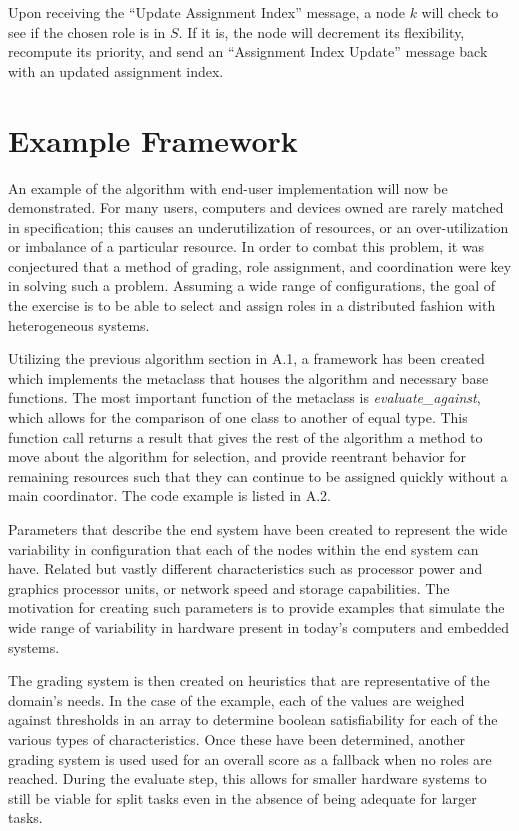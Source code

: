 \documentclass[11pt]{article}
\begin{document}
\begin{multicols}{2}
Upon receiving the ``Update Assignment Index'' message, a node $k$ will check to see if the chosen role is in $S$. If it is, the node will decrement its flexibility, recompute its priority, and send an ``Assignment Index Update'' message back with an updated assignment index.

\section{Example Framework}
An example of the algorithm with end-user implementation will now be demonstrated.  For many users, computers and devices owned are rarely matched in specification; this causes an underutilization of resources, or an over-utilization or imbalance of a particular resource.  In order to combat this problem, it was conjectured that a method of grading, role assignment, and coordination were key in solving such a problem.  Assuming a wide range of configurations, the goal of the exercise is to be able to select and assign roles in a distributed fashion with heterogeneous systems.

Utilizing the previous algorithm section in A.1, a framework has been created which implements the metaclass that houses the algorithm and necessary base functions.  The most important function of the metaclass is \textit{evaluate\_against}, which allows for the comparison of one class to another of equal type.  This function call returns a result that gives the rest of the algorithm a method to move about the algorithm for selection, and provide reentrant behavior for remaining resources such that they can continue to be assigned quickly without a main coordinator.  The code example is listed in A.2.

Parameters that describe the end system have been created to represent the wide variability in configuration that each of the nodes within the end system can have.  Related but vastly different characteristics such as processor power and graphics processor units, or network speed and storage capabilities.  The motivation for creating such parameters is to provide examples that simulate the wide range of variability in hardware present in today's computers and embedded systems.

The grading system is then created on heuristics that are representative of the domain's needs.  In the case of the example, each of the values are weighed against thresholds in an array to determine boolean satisfiability for each of the various types of characteristics.  Once these have been determined, another grading system is used used for an overall score as a fallback when no roles are reached.  During the evaluate step, this allows for smaller hardware systems to still be viable for split tasks even in the absence of being adequate for larger tasks.


\end{multicols}
\end{document}
